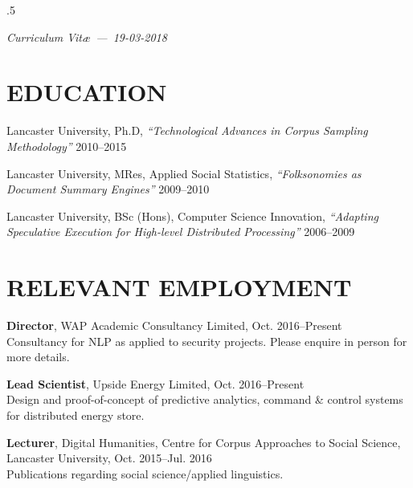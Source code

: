 \documentclass{res}
\begin{document}
\thispagestyle{empty} %
\address{\\
\texttt{\ \ \ \ \ <steve@watt.am>}\\
\texttt{http://stephenwattam.com/}}


\begin{resume}
\vspace{0.2in}
\moveleft.5\sectionwidth\centerline{\it Curriculum Vit\ae~---~19-03-2018}

\section{EDUCATION}
\vspace{0.1in}


    Lancaster University, Ph.D,
    \textit{``Technological Advances in Corpus Sampling Methodology''}
    2010--2015

    Lancaster University, MRes,
    Applied Social Statistics,
    \textit{``Folksonomies as Document Summary \mbox{Engines}''}
    2009--2010

    Lancaster University, BSc (Hons),
    Computer Science Innovation,
    \textit{``Adapting Speculative Execution for High-level Distributed Processing''}
    2006--2009



\section{RELEVANT EMPLOYMENT}
\vspace{0.1in}

    {\bf Director},
    WAP Academic Consultancy Limited,
    Oct. 2016--Present\\ 
    Consultancy for NLP as applied to security projects.  Please enquire in person for more details.

    {\bf Lead Scientist},
    Upside Energy Limited,
    Oct. 2016--Present\\
    Design and proof-of-concept of predictive analytics, command \& control systems for distributed energy store.

    {\bf Lecturer},
    Digital Humanities, Centre for Corpus Approaches to Social Science,
    Lancaster University,
    Oct. 2015--Jul. 2016\\
    Publications regarding social science/applied linguistics.


\end{resume}
\end{document}
